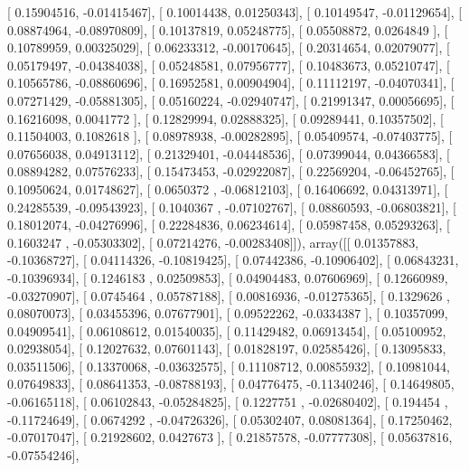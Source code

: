 \documentclass{article}
\begin{document}
       [ 0.15904516, -0.01415467],
       [ 0.10014438,  0.01250343],
       [ 0.10149547, -0.01129654],
       [ 0.08874964, -0.08970809],
       [ 0.10137819,  0.05248775],
       [ 0.05508872,  0.0264849 ],
       [ 0.10789959,  0.00325029],
       [ 0.06233312, -0.00170645],
       [ 0.20314654,  0.02079077],
       [ 0.05179497, -0.04384038],
       [ 0.05248581,  0.07956777],
       [ 0.10483673,  0.05210747],
       [ 0.10565786, -0.08860696],
       [ 0.16952581,  0.00904904],
       [ 0.11112197, -0.04070341],
       [ 0.07271429, -0.05881305],
       [ 0.05160224, -0.02940747],
       [ 0.21991347,  0.00056695],
       [ 0.16216098,  0.0041772 ],
       [ 0.12829994,  0.02888325],
       [ 0.09289441,  0.10357502],
       [ 0.11504003,  0.1082618 ],
       [ 0.08978938, -0.00282895],
       [ 0.05409574, -0.07403775],
       [ 0.07656038,  0.04913112],
       [ 0.21329401, -0.04448536],
       [ 0.07399044,  0.04366583],
       [ 0.08894282,  0.07576233],
       [ 0.15473453, -0.02922087],
       [ 0.22569204, -0.06452765],
       [ 0.10950624,  0.01748627],
       [ 0.0650372 , -0.06812103],
       [ 0.16406692,  0.04313971],
       [ 0.24285539, -0.09543923],
       [ 0.1040367 , -0.07102767],
       [ 0.08860593, -0.06803821],
       [ 0.18012074, -0.04276996],
       [ 0.22284836,  0.06234614],
       [ 0.05987458,  0.05293263],
       [ 0.1603247 , -0.05303302],
       [ 0.07214276, -0.00283408]]), array([[ 0.01357883, -0.10368727],
       [ 0.04114326, -0.10819425],
       [ 0.07442386, -0.10906402],
       [ 0.06843231, -0.10396934],
       [ 0.1246183 ,  0.02509853],
       [ 0.04904483,  0.07606969],
       [ 0.12660989, -0.03270907],
       [ 0.0745464 ,  0.05787188],
       [ 0.00816936, -0.01275365],
       [ 0.1329626 ,  0.08070073],
       [ 0.03455396,  0.07677901],
       [ 0.09522262, -0.0334387 ],
       [ 0.10357099,  0.04909541],
       [ 0.06108612,  0.01540035],
       [ 0.11429482,  0.06913454],
       [ 0.05100952,  0.02938054],
       [ 0.12027632,  0.07601143],
       [ 0.01828197,  0.02585426],
       [ 0.13095833,  0.03511506],
       [ 0.13370068, -0.03632575],
       [ 0.11108712,  0.00855932],
       [ 0.10981044,  0.07649833],
       [ 0.08641353, -0.08788193],
       [ 0.04776475, -0.11340246],
       [ 0.14649805, -0.06165118],
       [ 0.06102843, -0.05284825],
       [ 0.1227751 , -0.02680402],
       [ 0.194454  , -0.11724649],
       [ 0.0674292 , -0.04726326],
       [ 0.05302407,  0.08081364],
       [ 0.17250462, -0.07017047],
       [ 0.21928602,  0.0427673 ],
       [ 0.21857578, -0.07777308],
       [ 0.05637816, -0.07554246],
\end{document}
